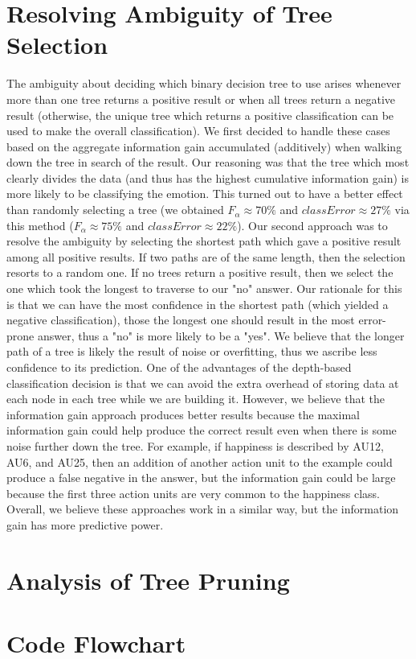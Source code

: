 \documentclass[11pt]{amsart}
\begin{document}
\section{Resolving Ambiguity of Tree Selection}
The ambiguity about deciding which binary decision tree to use arises whenever more than one tree returns a positive result or when all trees return a negative result (otherwise, the unique tree which returns a positive classification can be used to make the overall classification).  We first decided to handle these cases based on the aggregate information gain accumulated (additively) when walking down the tree in search of the result.  Our reasoning was that the tree which most clearly divides the data (and thus has the highest cumulative information gain) is more likely to be classifying the emotion.  This turned out to have a better effect than randomly selecting a tree (we obtained $F_{\alpha} \approx 70\%$ and $classError \approx 27\%$ via this method ($F_{\alpha} \approx 75\%$ and $classError \approx 22\%$).  
Our second approach was to resolve the ambiguity by selecting the shortest path which gave a positive result among all positive results.  If two paths are of the same length, then the selection resorts to a random one.  If no trees return a positive result, then we select the one which took the longest to traverse to our "no" answer.  Our rationale for this is that we can have the most confidence in the shortest path (which yielded a negative classification), those the longest one should result in the most error-prone answer, thus a "no" is more likely to be a "yes".  We believe that the longer path of a tree is likely the result of noise or overfitting, thus we ascribe less confidence to its prediction.
One of the advantages of the depth-based classification decision is that we can avoid the extra overhead of storing data at each node in each tree while we are building it.  However, we believe that the information gain approach produces better results because the maximal information gain could help produce the correct result even when there is some noise further down the tree.  For example, if happiness is described by AU12, AU6, and AU25, then an addition of another action unit to the example could produce a false negative in the answer, but the information gain could be large because the first three action units are very common to the happiness class.  Overall, we believe these approaches work in a similar way, but the information gain has more predictive power.
\section{Analysis of Tree Pruning}


\section{Code Flowchart}
\end{document}

